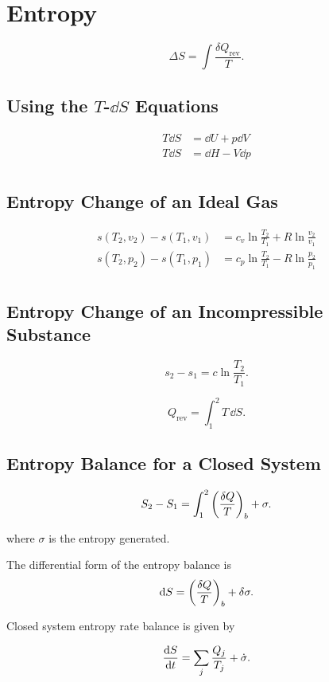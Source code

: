 \documentclass{report}
\begin{document}
\chapter{Entropy}

\[
	\Delta S = \int \frac{\delta Q_\text{rev}}{T}
	.\]

\section{Using the $T$-$\dd{S}$ Equations}

\begin{align*}
	T\dd{S} & = \dd{U} + p\dd{V} \\
	T\dd{S} & = \dd{H} - V\dd{p} \\
\end{align*}

\section{Entropy Change of an Ideal Gas}

\begin{align*}
	s(T_2, v_2) - s(T_1, v_1) & = c_v \ln\frac{T_2}{T_1} + R\ln\frac{v_2}{v_1} \\
	s(T_2, p_2) - s(T_1, p_1) & = c_p \ln\frac{T_2}{T_1} - R\ln\frac{p_2}{p_1} \\
\end{align*}

\section{Entropy Change of an Incompressible Substance}

\[
	s_2 - s_1 = c\ln\frac{T_2}{T_1}
	.\]

\[
	Q_\text{rev} = \int_1^2 T\,\dd{S}
	.\]

\section{Entropy Balance for a Closed System}

\[
	S_2 - S_1 = \int_1^2 \left(\frac{\delta Q}{T}\right)_b + \sigma
	.\]

where $\sigma$ is the entropy generated.

The differential form of the entropy balance is
\[
	\mathrm{d}S = \left(\frac{\delta Q}{T}\right)_b + \delta\sigma
	.\]

Closed system entropy rate balance is given by

\[
	\dv{S}{t} = \sum_j \frac{Q_j}{T_j} + \dot{\sigma}
	.\]
\end{document}
